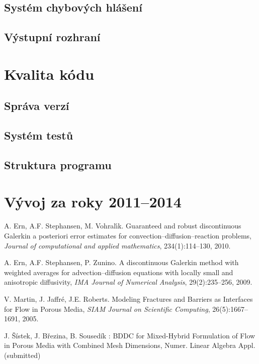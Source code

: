 \documentclass[11pt]{report}
\begin{document}
\subsection{Systém chybových hlášení}
\subsection{Výstupní rozhraní}

\section{Kvalita kódu}
\subsection{Správa verzí}
\subsection{Systém testů}
\subsection{Struktura programu}



\section{Vývoj za roky 2011--2014}

\begin{thebibliography}{99}

A. Ern, A.F. Stephansen, M. Vohral{\'\i}k.
Guaranteed and robust discontinuous Galerkin a posteriori error estimates for convection--diffusion--reaction problems,
\emph{Journal of computational and applied mathematics}, 234(1):114--130, 2010.


A. Ern, A.F. Stephansen, P. Zunino.
A discontinuous {G}alerkin method with weighted averages for advection--diffusion equations with locally small and anisotropic diffusivity,
\emph{IMA Journal of Numerical Analysis}, 29(2):235--256, 2009.


V. Martin, J. Jaffr{\'e}, J.E. Roberts.
Modeling Fractures and Barriers as Interfaces for Flow in Porous Media,
\emph{{SIAM} Journal on Scientific Computing}, 26(5):1667--1691, 2005.


J. Šístek, J. Březina, B. Sousedík : BDDC for Mixed-Hybrid 
Formulation of Flow in Porous Media with Combined Mesh Dimensions, Numer. Linear 
Algebra Appl. (submitted)
\end{thebibliography}
\end{document}

